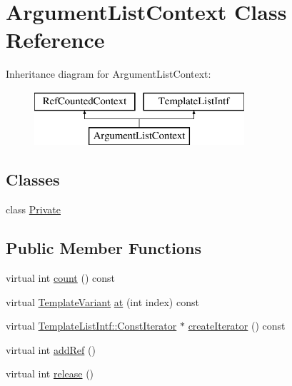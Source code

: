 \hypertarget{class_argument_list_context}{}\section{Argument\+List\+Context Class Reference}
\label{class_argument_list_context}
Inheritance diagram for Argument\+List\+Context\+:\begin{figure}[H]
\begin{center}
\leavevmode
\includegraphics[height=2.000000cm]{class_argument_list_context}
\end{center}
\end{figure}
\subsection*{Classes}
\begin{DoxyCompactItemize}
\item 
class \mbox{\hyperlink{class_argument_list_context_1_1_private}{Private}}
\end{DoxyCompactItemize}
\subsection*{Public Member Functions}
\begin{DoxyCompactItemize}
\item 
virtual int \mbox{\hyperlink{class_argument_list_context_a178ceda7e6b509e85aecc898ebefe1ed}{count}} () const
\item 
virtual \mbox{\hyperlink{class_template_variant}{Template\+Variant}} \mbox{\hyperlink{class_argument_list_context_ac3c4acdd80cab2fcbd53eed215034fe1}{at}} (int index) const
\item 
virtual \mbox{\hyperlink{class_template_list_intf_1_1_const_iterator}{Template\+List\+Intf\+::\+Const\+Iterator}} $\ast$ \mbox{\hyperlink{class_argument_list_context_aeba72b5aa63d93c1444448170b5c6612}{create\+Iterator}} () const
\item 
virtual int \mbox{\hyperlink{class_argument_list_context_a378c354cf154e3505e9d5a706ceaea55}{add\+Ref}} ()
\item 
virtual int \mbox{\hyperlink{class_argument_list_context_a7e22b3f45a889508dba94e578c8661f2}{release}} ()
\end{DoxyCompactItemize}
